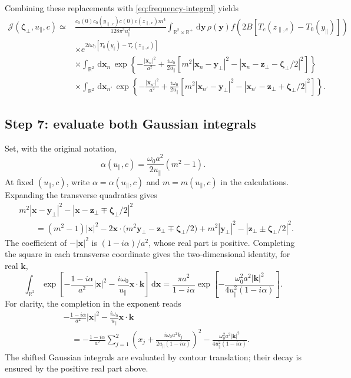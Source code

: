 \documentclass[11pt]{article}
\newcommand{\R}{\mathbb{R}}
\newcommand{\bx}{\bm{x}}
\newcommand{\by}{\bm{y}}
\newcommand{\bz}{\bm{z}}
\newcommand{\bk}{\bm{k}}
\newcommand{\bzeta}{\boldsymbol{\zeta}}
\newcommand{\dd}{\,\mathrm{d}}
\begin{document}
Combining these replacements with \eqref{eq:frequency-integral} yields
\begin{align}
\mathcal J(\bzeta_\perp,u_\parallel,c)
\simeq{}&
\frac{c_0(0)c_0(y_{\parallel,c})c(0)c(z_{\parallel,c})m^4}
{128\pi^3u_\parallel^4}
\int_{\R^2\times\R^+}\dd\by\,\rho(\by)
f\!\left(2B[T_c(z_{\parallel,c})-T_0(y_\parallel)]\right)
\nonumber\\
&\times e^{2i\omega_0[T_0(y_\parallel)-T_c(z_{\parallel,c})]}
\nonumber\\
&\times\int_{\R^2}\dd\bx_n\,
\exp\!\left\{-\frac{|\bx_n|^2}{a^2}
+\frac{i\omega_0}{2u_\parallel}
\left[m^2|\bx_n-\by_\perp|^2
-|\bx_n-\bz_\perp-\bzeta_\perp/2|^2\right]\right\}
\nonumber\\
&\times\int_{\R^2}\dd\bx_{n'}\,
\exp\!\left\{-\frac{|\bx_{n'}|^2}{a^2}
+\frac{i\omega_0}{2u_\parallel}
\left[m^2|\bx_{n'}-\by_\perp|^2
-|\bx_{n'}-\bz_\perp+\bzeta_\perp/2|^2\right]\right\}.
\label{eq:J-frozen}
\end{align}

\subsection{Step 7: evaluate both Gaussian integrals}

Set, with the original notation,
\begin{equation}
\alpha(u_\parallel,c)=\frac{\omega_0a^2}{2u_\parallel}(m^2-1).
\label{eq:alpha}
\end{equation}
At fixed $(u_\parallel,c)$, write $\alpha=\alpha(u_\parallel,c)$ and
$m=m(u_\parallel,c)$ in the calculations. Expanding the transverse
quadratics gives
\begin{align}
&m^2|\bx-\by_\perp|^2
-|\bx-\bz_\perp\mp\bzeta_\perp/2|^2
\nonumber\\
&\qquad=(m^2-1)|\bx|^2
-2\bx\cdot\big(m^2\by_\perp-\bz_\perp\mp\bzeta_\perp/2\big)
+m^2|\by_\perp|^2-|\bz_\perp\pm\bzeta_\perp/2|^2.
\label{eq:expand-quadratic}
\end{align}
The coefficient of $-|\bx|^2$ is $(1-i\alpha)/a^2$, whose real
part is positive. Completing the square in each transverse coordinate
gives the two-dimensional identity, for real $\bk$,
\begin{equation}
\int_{\R^2}
\exp\!\left[-\frac{1-i\alpha}{a^2}|\bx|^2
-\frac{i\omega_0}{u_\parallel}\bx\cdot\bk\right]\dd\bx
=\frac{\pi a^2}{1-i\alpha}
\exp\!\left[-\frac{\omega_0^2a^2|\bk|^2}
{4u_\parallel^2(1-i\alpha)}\right].
\label{eq:gaussian-point}
\end{equation}
For clarity, the completion in the exponent reads
\begin{align}
&-\frac{1-i\alpha}{a^2}|\bx|^2
-\frac{i\omega_0}{u_\parallel}\bx\cdot\bk
\nonumber\\
&\quad=-\frac{1-i\alpha}{a^2}
\sum_{j=1}^2\left(x_j+
\frac{i\omega_0a^2 k_j}{2u_\parallel(1-i\alpha)}\right)^2
-\frac{\omega_0^2a^2|\bk|^2}{4u_\parallel^2(1-i\alpha)}.
\end{align}
The shifted Gaussian integrals are evaluated by contour translation;
their decay is ensured by the positive real part above.
\end{document}
